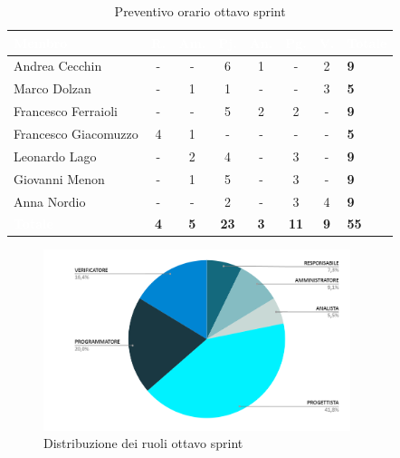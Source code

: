 {
\setlength{\tabcolsep}{10pt}
\renewcommand{\arraystretch}{1.5}
\begin{table}[h!]
    \centering
    \begin{tabularx}{\textwidth}{| l | c | c | c | c | c | c | X |}
        \hline
        \rowcolor{headerrow} \textbf{\textcolor{white}{Membro}} & \textbf{\textcolor{white}{R.}} & \textbf{\textcolor{white}{Am.}} & \textbf{\textcolor{white}{Pj.}} & \textbf{\textcolor{white}{An.}} & \textbf{\textcolor{white}{Pg.}} & \textbf{\textcolor{white}{V.}} & \textbf{\textcolor{white}{Totale}} \\
        \hline
        Andrea Cecchin & - & - & 6 & 1 & - & 2 & \textbf{9} \\
        \hline
        Marco Dolzan & - & 1 & 1 & - & - & 3 & \textbf{5} \\
        \hline
        Francesco Ferraioli & - & - & 5 & 2 & 2 & - & \textbf{9} \\
        \hline  
        Francesco Giacomuzzo & 4 & 1 & - & - & - & - & \textbf{5} \\
        \hline
        Leonardo Lago & - & 2 & 4 & - & 3 & - & \textbf{9} \\
        \hline
        Giovanni Menon & - & 1 & 5 & - & 3 & - & \textbf{9} \\
        \hline
        Anna Nordio & - & - & 2 & - & 3 & 4 & \textbf{9} \\
        \hline
    \cellcolor{headerrow} \textbf{\textcolor{white}{Totale}} & \textbf{4} & \textbf{5} & \textbf{23} & \textbf{3} & \textbf{11} & \textbf{9} & \textbf{55} \\
        \hline
    \end{tabularx} 
    \caption{Preventivo orario ottavo sprint}
    \label{tab:preventivoorarioottavosprint}
\end{table}
}

\begin{figure}[h!]
    \centering
    \includegraphics[width=0.8\textwidth]{prev8ruoli.png}
    \caption{Distribuzione dei ruoli ottavo sprint}
    \label{fig:preventivoorarioottavosprint}
\end{figure}



